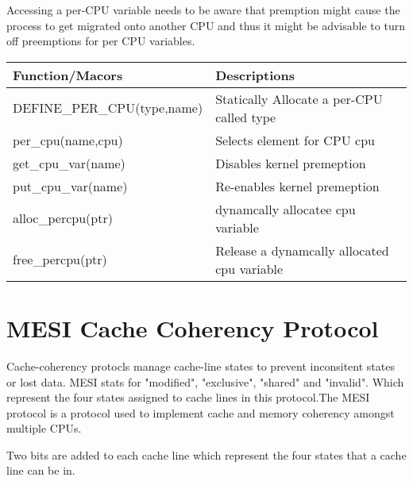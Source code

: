\documentclass{article}
\begin{document}
Accessing a per-CPU variable needs to be aware that premption might
cause the process to get migrated onto another CPU and thus it might
be advisable to turn off preemptions for per CPU variables.


\begin{center}
  \begin{tabular}{ l | l }
    
    \hline
    Function/Macors & Descriptions \\ \hline
    DEFINE\_PER\_CPU(type,name) & Statically Allocate a per-CPU called type \\ 
    per\_cpu(name,cpu) & Selects element for CPU cpu \\ 
    get\_cpu\_var(name) &  Disables kernel premeption \\
    put\_cpu\_var(name) &  Re-enables kernel premeption \\
    alloc\_percpu(ptr) &  dynamcally allocatee cpu variable \\
    free\_percpu(ptr) &  Release a dynamcally allocated cpu variable \\
    \hline
  \end{tabular}
\end{center}

\section{MESI Cache Coherency Protocol}

Cache-coherency protocls manage cache-line states to prevent
inconsitent states or lost data. MESI stats for "modified",
"exclusive", "shared" and "invalid". Which represent the four states
assigned to cache lines in this protocol.The MESI protocol is a
protocol used to implement cache and memory coherency amongst multiple
CPUs. \cite{Birdetal2001}

Two bits are added to each cache line which represent the four states
that a cache line can be in.
\end{document}
